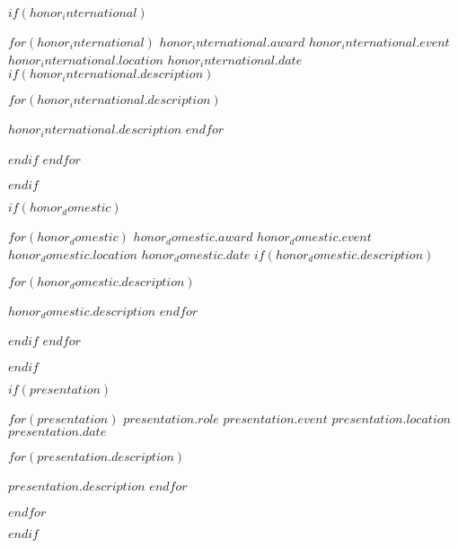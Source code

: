 \documentclass[11pt, a4paper]{awesome-cv}
\begin{document}

    $if(honor_international)$

    \begin{cvhonors}
        $for(honor_international)$
        \cvhonor
        {$honor_international.award$} %
        {$honor_international.event$} %
        {$honor_international.location$} %
        {$honor_international.date$} %
        $if(honor_international.description)$
        {
        \begin{cvitems}
            $for(honor_international.description)$
            \item {$honor_international.description$}
            $endfor$
        \end{cvitems}
        }
        $endif$
        $endfor$
    \end{cvhonors}
    $endif$

    $if(honor_domestic)$

    \begin{cvhonors}
        $for(honor_domestic)$
        \cvhonor
        {$honor_domestic.award$} %
        {$honor_domestic.event$} %
        {$honor_domestic.location$} %
        {$honor_domestic.date$} %
        $if(honor_domestic.description)$
        {
        \begin{cvitems}
            $for(honor_domestic.description)$
            \item {$honor_domestic.description$}
            $endfor$
        \end{cvitems}
        }
        $endif$
        $endfor$
    \end{cvhonors}
    $endif$


    $if(presentation)$

    \begin{cventries}
        $for(presentation)$
        \cventry
        {$presentation.role$} %
        {$presentation.event$} %
        {$presentation.location$} %
        {$presentation.date$} %
        {
        \begin{cvitems}
            $for(presentation.description)$
            \item {$presentation.description$}
            $endfor$
        \end{cvitems}
        }
        $endfor$
    \end{cventries}
    $endif$
\end{document}
